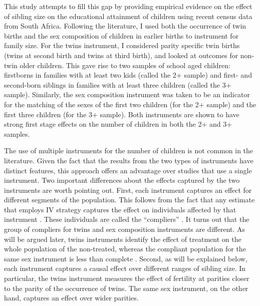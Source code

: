 This study attempts to fill this gap by providing empirical evidence on the effect of sibling size on the educational attainment of children using recent census data from South Africa. Following the literature, I used both the occurrence of twin births and the sex composition of children in earlier births to instrument for family size. For the twins instrument, I considered parity specific twin births (twins at second birth and twins at third birth), and looked at outcomes for non-twin older children. This gave rise to two samples of school aged children: firstborns in families with at least two kids (called the 2+ sample) and first- and second-born siblings in families with at least three children (called the 3+ sample). Similarly, the sex composition instrument was taken to be an indicator for the matching of the sexes of the first two children (for the 2+ sample) and the first three children (for the 3+ sample). Both instruments are shown to have strong first stage effects on the number of children in both the 2+ and 3+ samples.

The use of multiple instruments for the number of children is not common in the literature. Given the fact that the results from the two types of instruments have distinct features, this approach offers an advantage over studies that use a single instrument. Two important differences about the effects captured by the two instruments are worth pointing out. First, each instrument captures an effect for different segments of the population. This follows from the fact that any estimate that employs IV strategy captures the effect on individuals affected by that instrument \parencite{imbens_identification_1994}. These individuals are called the \enquote{compliers} \parencite{angrist_identification_1996}. It turns out that the group of compliers for twins and sex composition instruments are different. As will be argued later, twins instruments identify the effect of treatment on the whole population of the non-treated, whereas the compliant population for the same sex instrument is less than complete \parencite{Angrist2006,Angrist2009}. Second, as will be explained below, each instrument captures a causal effect over different ranges of sibling size. In particular, the twins instrument measures the effect of fertility at parities closer to the parity of the occurrence of twins. The same sex instrument, on the other hand, captures an effect over wider parities. 

